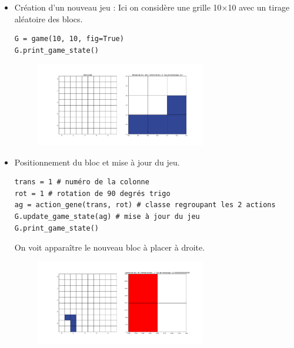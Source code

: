 \documentclass[10pt,a4paper]{article}
\begin{document}
\begin{itemize}
	\item Création d'un nouveau jeu : Ici on considère une grille 10$\times$10 avec un tirage aléatoire des blocs.
\begin{verbatim}
G = game(10, 10, fig=True)
G.print_game_state()
\end{verbatim}

\begin{figure}[ht!]
	\centering
	\includegraphics[width=0.7\textwidth]{new_game.pdf}
\end{figure}
\item Positionnement du bloc et mise à jour du jeu.
\begin{verbatim}
trans = 1 # numéro de la colonne
rot = 1 # rotation de 90 degrés trigo
ag = action_gene(trans, rot) # classe regroupant les 2 actions
G.update_game_state(ag) # mise à jour du jeu
G.print_game_state()
\end{verbatim}

On voit apparaître le nouveau bloc à placer à droite.
\begin{figure}[ht!]
	\centering
	\includegraphics[width=0.7\textwidth]{update_game.pdf}
\end{figure}


\end{itemize}
\end{document}
